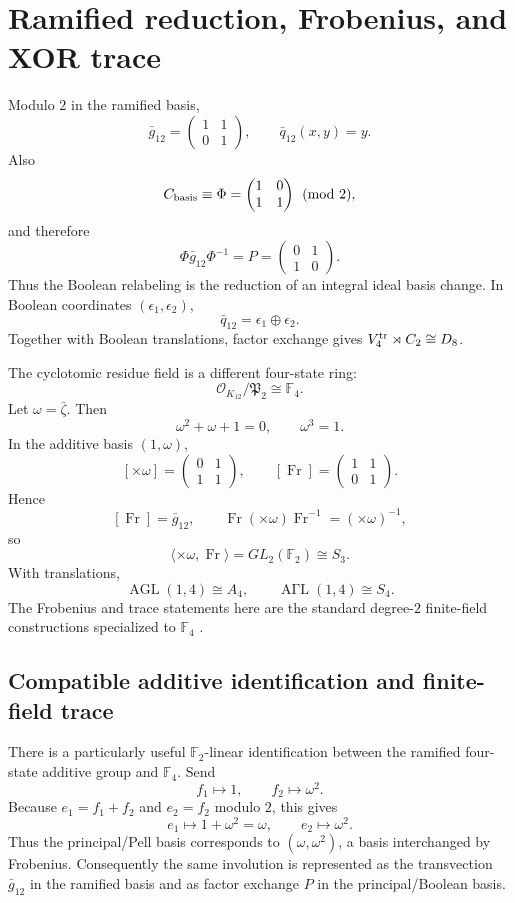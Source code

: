 \documentclass[11pt]{article}
\theoremstyle{remark}
\newcommand{\F}{\mathbb F}
\newcommand{\OO}{\mathcal O}
\newcommand{\Fr}{\operatorname{Fr}}
\begin{document}
\section{Ramified reduction, Frobenius, and XOR trace}

Modulo $2$ in the ramified basis,
\[
\bar g_{12}
=\begin{pmatrix}1&1\\0&1\end{pmatrix},
\qquad
\bar q_{12}(x,y)=y.
\]
Also
\[
C_{\rm basis}\equiv
\Phi=\begin{pmatrix}1&0\\1&1\end{pmatrix}\pmod2,
\]
and therefore
\[
\Phi\bar g_{12}\Phi^{-1}
=P=\begin{pmatrix}0&1\\1&0\end{pmatrix}.
\]
Thus the Boolean relabeling is the reduction of an integral ideal basis
change.  In Boolean coordinates $(\epsilon_1,\epsilon_2)$,
\[
\bar q_{12}=\epsilon_1\oplus\epsilon_2.
\]
Together with Boolean translations, factor exchange gives
$V_4^{\rm tr}\rtimes C_2\cong D_8$.

The cyclotomic residue field is a different four-state ring:
\[
\boxed{\OO_{K_{12}}/\mathfrak P_2\cong\F_4.}
\]
Let $\omega=\bar\zeta$.  Then
\[
\omega^2+\omega+1=0,
\qquad \omega^3=1.
\]
In the additive basis $(1,\omega)$,
\[
[\times\omega]=\begin{pmatrix}0&1\\1&1\end{pmatrix},
\qquad
[\Fr]=\begin{pmatrix}1&1\\0&1\end{pmatrix}.
\]
Hence
\[
\boxed{[\Fr]=\bar g_{12}},
\qquad
\Fr(\times\omega)\Fr^{-1}=(\times\omega)^{-1},
\]
so
\[
\langle\times\omega,\Fr\rangle
=GL_2(\F_2)\cong S_3.
\]
With translations,
\[
\operatorname{AGL}(1,4)\cong A_4,
\qquad
\operatorname{A\Gamma L}(1,4)\cong S_4.
\]
The Frobenius and trace statements here are the standard degree-$2$
finite-field constructions specialized to $\F_4$ \cite{LidlNiederreiter}.

\subsection{Compatible additive identification and finite-field trace}

There is a particularly useful $\F_2$-linear identification between the
ramified four-state additive group and $\F_4$.  Send
\[
\boxed{f_1\longmapsto1,
\qquad f_2\longmapsto\omega^2.}
\]
Because $e_1=f_1+f_2$ and $e_2=f_2$ modulo $2$, this gives
\[
e_1\longmapsto1+\omega^2=\omega,
\qquad
e_2\longmapsto\omega^2.
\]
Thus the principal/Pell basis corresponds to $(\omega,\omega^2)$, a basis
interchanged by Frobenius.  Consequently the same involution is represented
as the transvection $\bar g_{12}$ in the ramified basis and as factor exchange
$P$ in the principal/Boolean basis.
\end{document}
